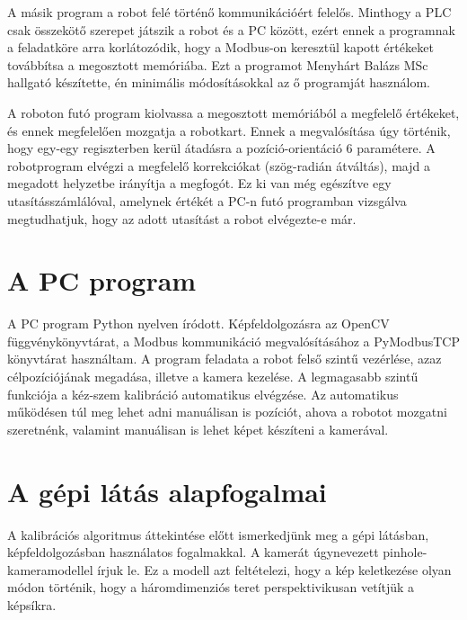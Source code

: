 \documentclass{article}
\begin{document}
	A másik program a robot felé történő kommunikációért felelős. Minthogy a PLC csak összekötő szerepet játszik a robot és a PC között, ezért ennek a programnak a feladatköre arra korlátozódik, hogy a Modbus-on keresztül kapott értékeket továbbítsa a megosztott memóriába. Ezt a programot Menyhárt Balázs MSc hallgató készítette, én minimális módosításokkal az ő programját használom.
	
	A roboton futó program kiolvassa a megosztott memóriából a megfelelő értékeket, és ennek megfelelően mozgatja a robotkart. Ennek a megvalósítása úgy történik, hogy egy-egy regiszterben kerül átadásra a pozíció-orientáció 6 paramétere. A robotprogram elvégzi a megfelelő korrekciókat (szög-radián átváltás), majd a megadott helyzetbe irányítja a megfogót. Ez ki van még egészítve egy utasításszámlálóval, amelynek értékét a PC-n futó programban vizsgálva megtudhatjuk, hogy az adott utasítást a robot elvégezte-e már.
	\newpage
	\section{A PC program}
	
	A PC program Python nyelven íródott. Képfeldolgozásra az OpenCV függvénykönyvtárat, a Modbus kommunikáció megvalósításához a PyModbusTCP könyvtárat használtam. A program feladata a robot felső szintű vezérlése, azaz célpozíciójának megadása, illetve a kamera kezelése. A legmagasabb szintű funkciója a kéz-szem kalibráció automatikus elvégzése. Az automatikus működésen túl meg lehet adni manuálisan is pozíciót, ahova a robotot mozgatni szeretnénk, valamint manuálisan is lehet képet készíteni a kamerával.
	
	

\newpage
	\section{A gépi látás alapfogalmai}
	A kalibrációs algoritmus áttekintése előtt ismerkedjünk meg a gépi látásban, képfeldolgozásban használatos fogalmakkal. A kamerát úgynevezett pinhole-kameramodellel írjuk le. Ez a modell azt feltételezi, hogy a kép keletkezése olyan módon történik, hogy a háromdimenziós teret perspektivikusan vetítjük a képsíkra.

%
	
\end{document}
